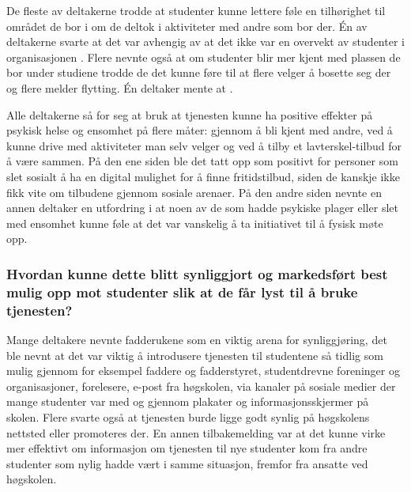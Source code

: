 De fleste av deltakerne trodde at studenter kunne lettere føle en tilhørighet til området de bor i om de deltok i aktiviteter med andre som bor der. Én av deltakerne svarte at det var avhengig av at det ikke var en overvekt av studenter i organisasjonen . Flere nevnte også at om studenter blir mer kjent med plassen de bor under studiene trodde de det kunne føre til at flere velger å bosette seg der og flere melder flytting. Én deltaker mente at .

Alle deltakerne så for seg at bruk at tjenesten kunne ha positive effekter på psykisk helse og ensomhet på flere måter: gjennom å bli kjent med andre, ved å kunne drive med aktiviteter man selv velger og ved å tilby et lavterskel-tilbud for å være sammen. På den ene siden ble det tatt opp som positivt for personer som slet sosialt å ha en digital mulighet for å finne fritidstilbud, siden de kanskje ikke fikk vite om tilbudene gjennom sosiale arenaer. På den andre siden nevnte en annen deltaker en utfordring i at noen av de som hadde psykiske plager eller slet med ensomhet kunne føle at det var vanskelig å ta initiativet til å fysisk møte opp.

\setlength{\leftskip}{0pt}
\subsubsection{Hvordan kunne dette blitt synliggjort og markedsført best mulig opp mot studenter slik at de får lyst til å bruke tjenesten?}
Mange deltakere nevnte fadderukene som en viktig arena for synliggjøring, det ble nevnt at det var viktig å introdusere tjenesten til studentene så tidlig som mulig gjennom for eksempel faddere og fadderstyret, studentdrevne foreninger og organisasjoner, forelesere, e-post fra høgskolen, via kanaler på sosiale medier der mange studenter var med og gjennom plakater og informasjonsskjermer på skolen. Flere svarte også at tjenesten burde ligge godt synlig på høgskolens nettsted eller promoteres der. En annen tilbakemelding var at det kunne virke mer effektivt om informasjon om tjenesten til nye studenter kom fra andre studenter som nylig hadde vært i samme situasjon, fremfor fra ansatte ved høgskolen.

